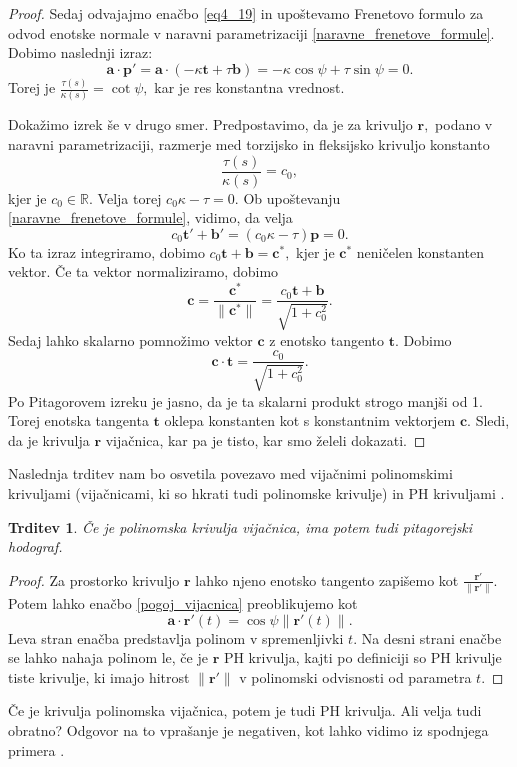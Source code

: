 \documentclass[12pt,a4paper,twoside]{article}
\theoremstyle{definition} %
\theoremstyle{plain} %
\newtheorem{trditev}[definicija]{Trditev}
\theoremstyle{primerstyle}
\numberwithin{equation}{section}  %
\newcommand{\R}{\mathbb R}
\newcommand{\tV}{\mathbf{t}}
\newcommand{\aV}{\mathbf{a}}
\newcommand{\bV}{\mathbf{b}}
\newcommand{\cV}{\mathbf{c}}
\newcommand{\pV}{\mathbf{p}}
\newcommand{\rV}{\mathbf{r}}
\begin{document}
\begin{proof}
	Sedaj odvajajmo enačbo \eqref{eq4_19} in upoštevamo Frenetovo formulo za odvod enotske normale v naravni parametrizaciji \eqref{naravne_frenetove_formule}. Dobimo naslednji izraz:
	\begin{equation*}
		\aV \cdot \pV'=\aV \cdot (-\kappa \tV+\tau \bV)=-\kappa \cos \psi + \tau \sin \psi=0.
	\end{equation*}
	Torej je $\frac{\tau(s)}{\kappa(s)}=\cot \psi,$ kar je res konstantna vrednost.
	
	Dokažimo izrek še v drugo smer. Predpostavimo, da je za krivuljo $\rV,$ podano v naravni parametrizaciji, razmerje med torzijsko in fleksijsko krivuljo konstanto
	$$\frac{\tau(s)}{\kappa(s)}=c_0,$$
	kjer je $c_0\in\R.$ Velja torej $c_0\kappa-\tau=0.$ Ob upoštevanju \eqref{naravne_frenetove_formule}, vidimo, da velja
	$$c_0\tV'+\bV'=(c_0\kappa-\tau)\pV=0.$$
	Ko ta izraz integriramo, dobimo $c_0\tV+\bV=\cV^*,$ kjer je $\cV^*$ neničelen konstanten vektor. Če ta vektor normaliziramo, dobimo
	$$\cV=\frac{\cV^*}{\lVert\cV^*\rVert}=\frac{c_0\tV+\bV}{\sqrt{1+c_0^2}}.$$
	Sedaj lahko skalarno pomnožimo vektor $\cV$ z enotsko tangento $\tV.$ Dobimo
	$$\cV\cdot\tV=\frac{c_0}{\sqrt{1+c_0^2}}.$$
	Po Pitagorovem izreku je jasno, da je ta skalarni produkt strogo manjši od 1. Torej enotska tangenta $\tV$ oklepa konstanten kot s konstantnim vektorjem $\cV.$ Sledi, da je krivulja $\rV$ vijačnica, kar pa je tisto, kar smo želeli dokazati.
\end{proof}
Naslednja trditev nam bo osvetila povezavo med vijačnimi polinomskimi krivuljami (vijačnicami, ki so hkrati tudi polinomske krivulje) in PH krivuljami \cite{faroukietal2004}.
\begin{trditev}
	\label{trditev_vijacnica_PH}
	Če je polinomska krivulja vijačnica, ima potem tudi pitagorejski hodograf.
\end{trditev}
\begin{proof}
	Za prostorko krivuljo $\rV$ lahko njeno enotsko tangento zapišemo kot $\frac{\rV'}{\lVert \rV' \rVert}.$ Potem lahko enačbo \eqref{pogoj_vijacnica} preoblikujemo kot
	\begin{equation}
		\aV \cdot \rV'(t)=\cos \psi \lVert \rV'(t) \rVert.
	\end{equation}
	Leva stran enačba predstavlja polinom v spremenljivki $t.$ Na desni strani enačbe se lahko nahaja polinom le, če je $\rV$ PH krivulja, kajti po definiciji so PH krivulje tiste krivulje, ki imajo hitrost $\lVert \rV' \rVert$ v polinomski odvisnosti od parametra $t.$
\end{proof}
Če je krivulja polinomska vijačnica, potem je tudi PH krivulja. Ali velja tudi obratno? Odgovor na to vprašanje je negativen, kot lahko vidimo iz spodnjega primera \cite{beltranmonterde}.
\end{document}
